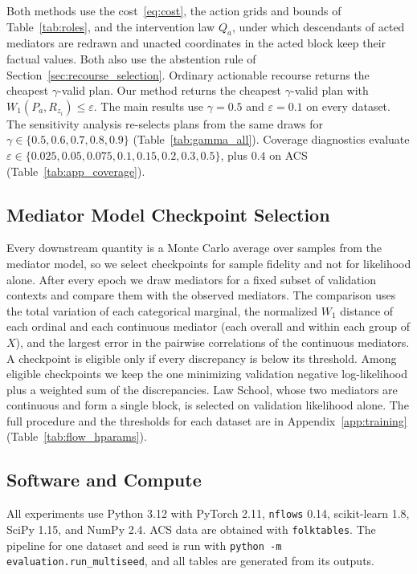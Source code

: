 Both methods use the cost~\eqref{eq:cost}, the action grids and bounds of
Table~\ref{tab:roles}, and the intervention law $Q_a$, under which
descendants of acted mediators are redrawn and unacted coordinates in the
acted block keep their factual values. Both also use the abstention rule of
Section~\ref{sec:recourse_selection}. Ordinary actionable recourse returns the
cheapest $\gamma$-valid plan. Our method returns the cheapest $\gamma$-valid
plan with $W_1(P_a,R_{z_i})\le\varepsilon$. The main results use $\gamma=0.5$
and $\varepsilon=0.1$ on every dataset. The sensitivity analysis re-selects
plans from the same draws for $\gamma\in\{0.5,0.6,0.7,0.8,0.9\}$
(Table~\ref{tab:gamma_all}). Coverage diagnostics evaluate
$\varepsilon\in\{0.025,0.05,0.075,0.1,0.15,0.2,0.3,0.5\}$, plus $0.4$ on ACS
(Table~\ref{tab:app_coverage}).

\subsection{Mediator Model Checkpoint Selection}
\label{app:exp_checkpoint}

Every downstream quantity is a Monte Carlo average over samples from the
mediator model, so we select checkpoints for sample fidelity and not for
likelihood alone. After every epoch we draw mediators for a fixed subset of
validation contexts and compare them with the observed mediators. The
comparison uses the total variation of each categorical marginal, the
normalized $W_1$ distance of each ordinal and each continuous mediator (each
overall and within each group of $X$), and the largest error in the pairwise
correlations of the continuous mediators. A checkpoint is eligible only if
every discrepancy is below its threshold. Among eligible checkpoints we keep
the one minimizing validation negative log-likelihood plus a weighted sum of
the discrepancies. Law School, whose two mediators are continuous and form a
single block, is selected on validation likelihood alone. The full procedure
and the thresholds for each dataset are in Appendix~\ref{app:training}
(Table~\ref{tab:flow_hparams}).

\subsection{Software and Compute}
\label{app:exp_software}

All experiments use Python 3.12 with PyTorch 2.11, \texttt{nflows} 0.14,
scikit-learn 1.8, SciPy 1.15, and NumPy 2.4. ACS data are obtained with
\texttt{folktables}. The pipeline for one dataset and seed is run with
\texttt{python -m evaluation.run\_multiseed}, and all tables are generated
from its outputs.
